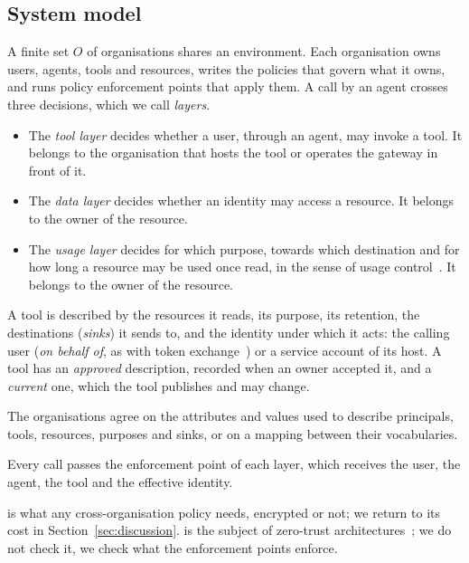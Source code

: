 \subsection{System model}
A finite set $O$ of organisations shares an environment. Each organisation owns users, agents, tools and resources, writes the policies that govern what it owns, and runs policy enforcement points that apply them. A call by an agent crosses three decisions, which we call \emph{layers}.
\begin{itemize}
\item The \emph{tool layer} decides whether a user, through an agent, may invoke a tool. It belongs to the organisation that hosts the tool or operates the gateway in front of it.
\item The \emph{data layer} decides whether an identity may access a resource. It belongs to the owner of the resource.
\item The \emph{usage layer} decides for which purpose, towards which destination and for how long a resource may be used once read, in the sense of usage control~\cite{park2004ucon}. It belongs to the owner of the resource.
\end{itemize}
A tool is described by the resources it reads, its purpose, its retention, the destinations (\emph{sinks}) it sends to, and the identity under which it acts: the calling user (\emph{on behalf of}, as with token exchange~\cite{rfc8693}) or a service account of its host. A tool has an \emph{approved} description, recorded when an owner accepted it, and a \emph{current} one, which the tool publishes and may change.

\begin{assumption}\label{as:vocab}
The organisations agree on the attributes and values used to describe principals, tools, resources, purposes and sinks, or on a mapping between their vocabularies.
\end{assumption}
\begin{assumption}[Mediation]\label{as:mediation}
Every call passes the enforcement point of each layer, which receives the user, the agent, the tool and the effective identity.
\end{assumption}
 is what any cross-organisation policy needs, encrypted or not; we return to its cost in Section~\ref{sec:discussion}.  is the subject of zero-trust architectures~\cite{nist800207a}; we do not check it, we check what the enforcement points enforce.

